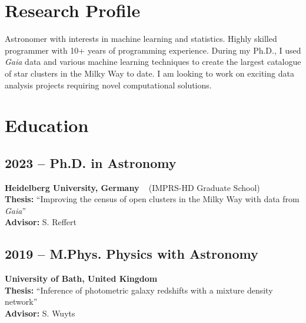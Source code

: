 \documentclass[12pt, letterpaper]{hunt-cv}
\begin{document}
\thispagestyle{plain}  %

\cvTitle

\section*{Research Profile}

Astronomer with interests in machine learning and statistics. Highly skilled programmer with 10+ years of programming experience. During my Ph.D., I used \emph{Gaia} data and various machine learning techniques to create the largest catalogue of star clusters in the Milky Way to date. I am looking to work on exciting data analysis projects requiring novel computational solutions.


\section*{Education}

\subsection*{2023 -- Ph.D. in Astronomy}
\begin{addmargin}[1em]{0em}
    \textbf{Heidelberg University, Germany} ~ (IMPRS-HD Graduate School)\\
    \textbf{Thesis:} ``Improving the census of open clusters in the Milky Way with data from \emph{Gaia}''\\
    \textbf{Advisor:} S. Reffert
\end{addmargin}

\subsection*{2019 -- M.Phys. Physics with Astronomy}
\begin{addmargin}[1em]{0em}
    \textbf{University of Bath, United Kingdom}\\
    \textbf{Thesis:} ``Inference of photometric galaxy redshifts with a
    mixture density network''\\
    \textbf{Advisor:} S. Wuyts
\end{addmargin}

\end{document}
